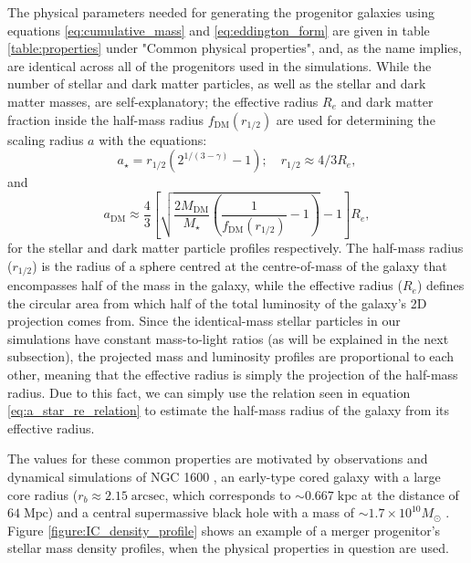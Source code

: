 \documentclass[english, oneside]{HYgradu}
\begin{document}
The physical parameters needed for generating the progenitor galaxies using equations \ref{eq:cumulative_mass} and \ref{eq:eddington_form} are given in table \ref{table:properties} under "Common physical properties", and, as the name implies, are identical across all of the progenitors used in the simulations. While the number of stellar and dark matter particles, as well as the stellar and dark matter masses, are self-explanatory; the effective radius $R_e$ and dark matter fraction inside the half-mass radius $f_\mathrm{DM}(r_{1/2})$ are used for determining the scaling radius $a$ with the equations:
\begin{equation}
a_\star = r_{1/2}(2^{1/(3-\gamma)}-1); \quad r_{1/2} \approx 4/3 R_e, \label{eq:a_star_re_relation}
\end{equation}
and
\begin{equation}
a_\mathrm{DM} \approx \frac{4}{3} \left[ \sqrt{\frac{2M_\mathrm{DM}}{M_\star} \left( \frac{1}{f_\mathrm{DM}(r_{1/2})} - 1 \right)} -1 \right] R_e,
\end{equation}
for the stellar and dark matter particle profiles respectively. The half-mass radius ($r_{1/2}$) is the radius of a sphere centred at the centre-of-mass of the galaxy that encompasses half of the mass in the galaxy, while the effective radius ($R_e$) defines the circular area from which half of the total luminosity of the galaxy's 2D projection comes from. Since the identical-mass stellar particles in our simulations have constant mass-to-light ratios (as will be explained in the next subsection), the projected mass and luminosity profiles are proportional to each other, meaning that the effective radius is simply the projection of the half-mass radius. Due to this fact, we can simply use the relation seen in equation \ref{eq:a_star_re_relation} to estimate the half-mass radius of the galaxy from its effective radius.

The values for these common properties are motivated by observations and dynamical simulations of NGC 1600 \citep{Rantala2018}, an early-type cored galaxy with a large core radius ($r_b \approx 2.15 \; \mathrm{arcsec}$, which corresponds to $\sim 0.667 \; \mathrm{kpc}$ at the distance of $64 \; \mathrm{Mpc}$) and a central supermassive black hole with a mass of $\sim 1.7 \times 10^{10} M_\odot$ \citep{Thomas2016}. Figure \ref{figure:IC_density_profile} shows an example of a merger progenitor's stellar mass density profiles, when the physical properties in question are used.
\end{document}
